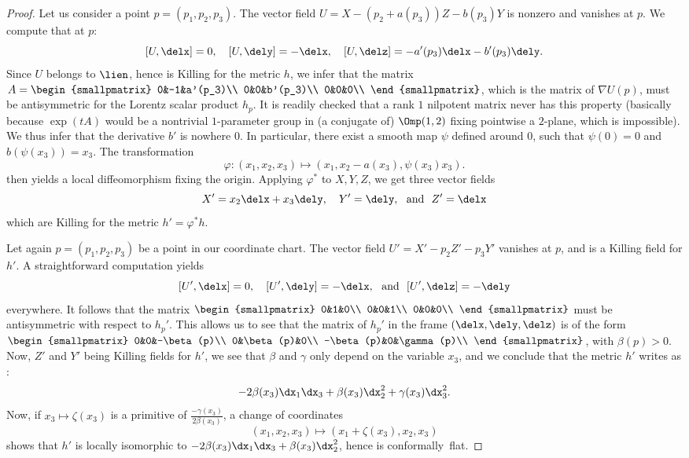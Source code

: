 \begin{proof}
Let us consider a point $p=(p_1,p_2,p_3)$. The vector field $U=X-(p_2+a(p_3))Z-b(p_3)Y$ is nonzero and vanishes at $p$. We compute that at $p$:
\[
\left[U,\delx\right]=0, \quad \left[U,\dely\right]=- \delx,\quad \left[U,\delz\right]=-a'(p_3)\delx-b'(p_3)\dely.
\]
Since $U$ belongs to $\lien$, hence is Killing for the metric $h$, we infer that the matrix $A=\begin{smallpmatrix}
0&-1&a'(p_3)\\
0&0&b'(p_3)\\
0&0&0\\
\end{smallpmatrix}$, which is the matrix of $\nabla U(p)$, must be antisymmetric for the Lorentz scalar product $h_p$. It is readily checked that a rank $1$ nilpotent matrix never has this property (basically because $\exp(tA)$ would be a nontrivial $1$-parameter group in (a conjugate of) $\Omp(1,2)$ fixing pointwise a $2$-plane, which is impossible). We thus infer that the derivative $b'$ is nowhere $0$. In particular, there exist a smooth map $\psi $ defined around $0$, such that $\psi(0)=0$ and $b(\psi(x_3))=x_3$. The transformation
\[
\varphi: (x_1,x_2,x_3) \mapsto (x_1,x_2 -a(x_3),\psi(x_3)x_3).
\]
then yields a local diffeomorphism fixing the origin. Applying $\varphi^*$ to $X,Y,Z$, we get three vector fields
\[
X'=x_2 \delx+x_3 \dely, \quad Y'=\dely,\ \text{ and }\ Z'=\delx
\]
which are Killing for the metric $h'=\varphi^*h$.

Let again $p=(p_1,p_2,p_3)$ be a point in our coordinate chart. The vector field $U'=X'-p_2 Z'-p_3Y'$ vanishes at $p$, and is a Killing field for $h'$. A straightforward computation yields
\[
[U',\delx]=0, \quad [U',\dely]=-\delx,\ \text{ and }\ [U',\delz]=-\dely
\]
everywhere. It follows that the matrix $
\begin{smallpmatrix}
0&1&0\\
0&0&1\\
0&0&0\\
\end{smallpmatrix} $ must be antisymmetric with respect to $h_p'$. This allows us to see that the matrix of $h_p'$ in the frame $(\delx,\dely,\delz)$ is of the form $
\begin{smallpmatrix}
0&0&-\beta(p)\\
0&\beta(p)&0\\
-\beta(p)&0&\gamma(p)\\
\end{smallpmatrix}$, with $\beta(p) >0$. Now, $Z'$ and $Y'$ being Killing fields for $h'$, we see that $\beta$ and $\gamma$ only depend on the variable $x_3$, and we conclude that the metric $h'$ writes as :
\[
-2 \beta(x_3)\dx_1\dx_3+\beta(x_3)\dx_2^2+\gamma(x_3)\dx_3^2.
\]
Now, if $x_3 \mapsto \zeta(x_3)$ is a primitive of $\frac{-\gamma(x_3)}{2 \beta(x_3)}$, a change of coordinates
\[
(x_1,x_2,x_3) \mapsto (x_1+\zeta(x_3),x_2,x_3)
\]
shows that $h'$ is locally isomorphic to
$-2\beta(x_3)\dx_1\dx_3+\beta(x_3)\dx_2^2$, hence is conformally~flat.
\end{proof}

